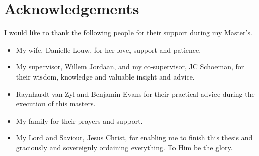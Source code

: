\chapter*{Acknowledgements}
\makeatletter{}\makeatother

I would like to thank the following people for their support during my Master's.

\begin{itemize}
	\item My wife, Danielle Louw, for her love, support and patience.
	
	\item My supervisor, Willem Jordaan, and my co-supervisor, JC Schoeman, for their wisdom, knowledge and valuable insight and advice.
	
	\item Raynhardt van Zyl and Benjamin Evans for their practical advice during the execution of this masters.
	
	\item My family for their prayers and support.
	
	\item My Lord and Saviour, Jesus Christ, for enabling me to finish this thesis and graciously and sovereignly ordaining everything. To Him be the glory.
	
\end{itemize}
